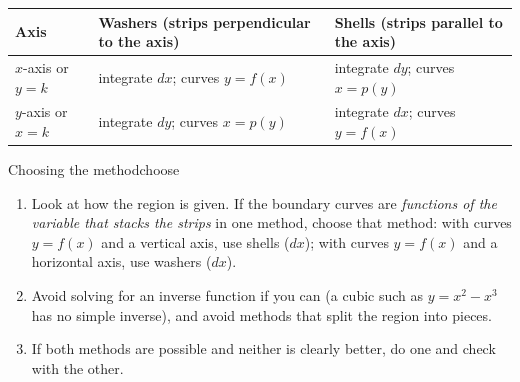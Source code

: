 \documentclass[11pt]{article}
\begin{document}
\begin{center}
\begin{tabular}{@{}lll@{}}\toprule
Axis & Washers (strips perpendicular to the axis) & Shells (strips parallel to the axis)\\\midrule
$x$-axis or $y=k$ & integrate $dx$; curves $y=f(x)$ & integrate $dy$; curves $x=p(y)$\\
$y$-axis or $x=k$ & integrate $dy$; curves $x=p(y)$ & integrate $dx$; curves $y=f(x)$\\\bottomrule
\end{tabular}
\end{center}

\begin{proc}{Choosing the method}{choose}
\begin{enumerate}[nosep]
  \item Look at how the region is given. If the boundary curves are \emph{functions of the variable that stacks the strips} in one method, choose that method: with curves $y=f(x)$ and a vertical axis, use shells ($dx$); with curves $y=f(x)$ and a horizontal axis, use washers ($dx$).
  \item Avoid solving for an inverse function if you can (a cubic such as $y=x^2-x^3$ has no simple inverse), and avoid methods that split the region into pieces.
  \item If both methods are possible and neither is clearly better, do one and check with the other.
\end{enumerate}
\end{proc}
\end{document}
